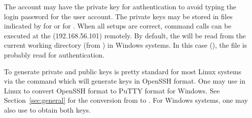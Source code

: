 The account may have the private key for authentication to avoid typing
the login password for the user account.
The private keys may be stored in files indicated by
 for  or
 for .
When all setups are correct, command calls can be executed at the
 (192.168.56.101) remotely.
By default, the  will be read from the current
working directory (from ) in Windows systems.
In this case (), the file
 is probably read
for authentication.

To generate private and public keys
is pretty standard for most Linux systems via the  command
which will generate keys in OpenSSH format.
One may use  in Linux to convert OpenSSH format to
PuTTY format for Windows.
See Section~\ref{sec:general} for the conversion from  to
.
For Windows systems, one may also use  to obtain both keys.

